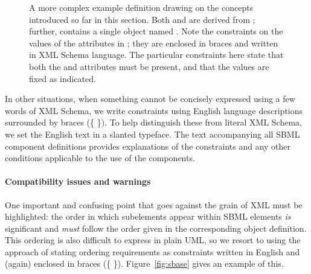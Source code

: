 \begin{figure}[htb]
  \centering
  \small
  \vspace*{-1ex}
  \caption{A more complex example definition drawing on
      the concepts introduced so far in this section.  Both
       and  are derived from
      ; further,  contains a
      single  object named .  Note the
      constraints on the values of the attributes in ;
      they are enclosed in braces and written in XML Schema
      language.  The particular constraints here state that both
      the  and  attributes must be
      present, and that the values are fixed as indicated.}
  \label{fig:unit-eg}
\end{figure}

In other situations, when something cannot be concisely expressed
using a few words of XML Schema, we write constraints using
English language descriptions surrounded by braces (\{ \}).  To
help distinguish these from literal XML Schema, we set the English
text in a slanted typeface.  The text accompanying all SBML
component definitions provides explanations of the constraints and
any other conditions applicable to the use of the components.


\paragraph{Compatibility issues and warnings}

One important and confusing point that goes against the grain of
XML must be highlighted: the order in which subelements appear
within SBML elements \emph{is} significant and \emph{must} follow
the order given in the corresponding object definition.  This
ordering is also difficult to express in plain UML, so we resort
to using the approach of stating ordering requirements as
constraints written in English and (again) enclosed in
braces (\{ \}).  Figure~\vref{fig:sbase} gives an example of this.

